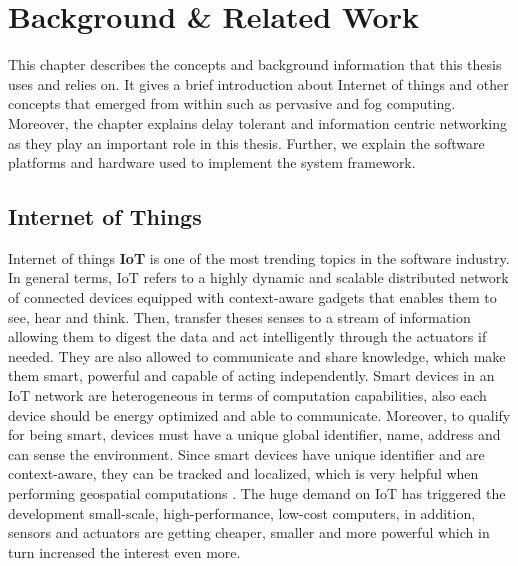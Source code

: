 
\chapter{Background \& Related Work}\label{chapter:background}

This chapter describes the concepts and background information that this thesis uses and relies on. It gives a brief introduction about Internet of things and other concepts that emerged from within such as pervasive and fog computing. Moreover, the chapter explains delay tolerant and information centric networking as they play an important role in this thesis. Further, we explain the software platforms and hardware used to implement the system framework.

\section{Internet of Things}

Internet of things \textbf{IoT} is one of the most trending topics in the software industry. In general terms, IoT refers to a highly dynamic and scalable distributed network of connected devices equipped with context-aware gadgets that enables them to see, hear and think\cite{DAC:DAC2417}. Then, transfer theses senses to a stream of information allowing them to digest the data and act intelligently through the actuators if needed. They are also allowed to communicate and share knowledge, which make them smart, powerful and capable of acting independently. Smart devices in an IoT network are heterogeneous in terms of computation capabilities, also each device should be energy optimized and able to communicate. Moreover, to qualify for being smart, devices must have a unique global identifier, name, address and can sense the environment. Since smart devices have unique identifier and are context-aware, they can be tracked and localized, which is very helpful when performing geospatial computations \cite{Miorandi20121497}. The huge demand on IoT has triggered the development small-scale, high-performance, low-cost computers, in addition, sensors and actuators are getting cheaper, smaller and more powerful which in turn increased the interest even more.
 

